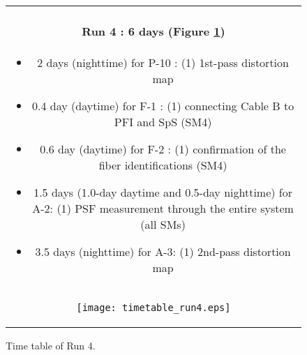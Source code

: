 \begin{figure}[!ht]
\begin{center}
\begin{tabular}{c}
\begin{minipage}{0.95\hsize}
\paragraph{Run 4 : 6 days  (Figure \ref{fig:run4})}
	\begin{itemize}
	\item 2 days (nighttime) for P-10 : 
	(1) 1st-pass distortion map
	\item 0.4 day (daytime) for F-1 :  
	(1) connecting Cable B to PFI and SpS (SM4)
	\item 0.6 day (daytime) for F-2 :  
	(1) confirmation of  the fiber identifications (SM4)
	\item 1.5 days (1.0-day daytime and 0.5-day nighttime) for A-2: 
	(1) PSF measurement through the entire system (all SMs)
	\item 3.5 days (nighttime) for A-3: 
	(1) 2nd-pass distortion map
	\end{itemize}
\end{minipage} \\
\begin{minipage}{0.8\hsize}
	\begin{center}
	\vspace*{5mm}
	\texttt{[image: timetable\_run4.eps]}
	\end{center}
	\vspace*{-5mm}
	\caption{Time table of Run 4.}
	\label{fig:run4}
\end{minipage}
\end{tabular}
\end{center}
\end{figure}



